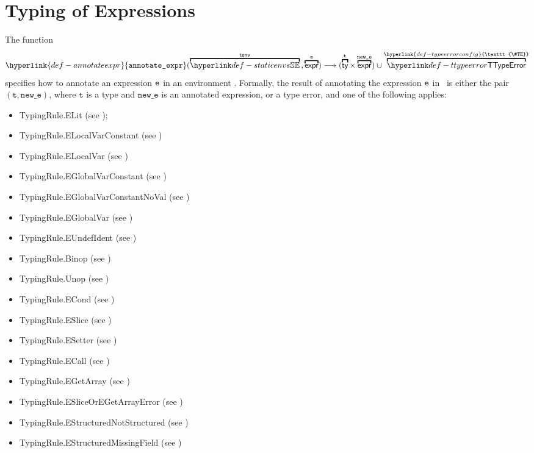 \documentclass{book}
\newcommand\TypeErrorConfig[0]{\hyperlink{def-typeerrorconfig}{\texttt{\#TE}}}
\newcommand\annotateexpr[1]{\hyperlink{def-annotateexpr}{\texttt{annotate\_expr}}(#1)}
\newcommand\vt[0]{\texttt{t}}
\newcommand\newe[0]{\texttt{new\_e}}
\begin{document}
\chapter{Typing of Expressions}
\hypertarget{def-annotateexpr}{}
The function
\[
  \annotateexpr{\overname{\staticenvs}{\tenv} \aslsep \overname{\expr}{\ve}}
  \aslto (\overname{\ty}{\vt} \times \overname{\expr}{\newe})
  \cup \overname{\TTypeError}{\TypeErrorConfig}
\]
specifies how to annotate an expression $\texttt{e}$ in
an environment \tenv.  Formally, the result of annotating the expression
$\texttt{e}$ in \tenv\ is either the pair $(\vt, \newe)$, where $\vt$ is a type and
$\newe$ is an annotated expression, or a type error, and one of the following applies:
\begin{itemize}
\item TypingRule.ELit (see );
\item TypingRule.ELocalVarConstant (see )
\item TypingRule.ELocalVar (see )
\item TypingRule.EGlobalVarConstant (see )
\item TypingRule.EGlobalVarConstantNoVal (see )
\item TypingRule.EGlobalVar (see )
\item TypingRule.EUndefIdent (see )
\item TypingRule.Binop (see )
\item TypingRule.Unop (see )
\item TypingRule.ECond (see )
\item TypingRule.ESlice (see )
\item TypingRule.ESetter (see )
\item TypingRule.ECall (see )
\item TypingRule.EGetArray (see )
\item TypingRule.ESliceOrEGetArrayError (see )
\item TypingRule.EStructuredNotStructured (see )
\item TypingRule.EStructuredMissingField (see )

\end{itemize}
\end{document}

